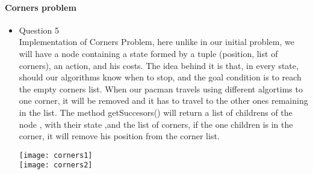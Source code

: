 \paragraph{Corners problem}
\begin{itemize}
\item{Question 5}\\

	\tab Implementation of Corners Problem, here unlike in our initial problem, we will have a node containing a state formed by a tuple (position, list of corners), an action, and his costs.
The idea behind it is that, in every state, should our algorithms know when to stop, and the goal condition is to reach the empty corners list. When our pacman travels using different algortims to one corner, it will be removed and it has to travel to the other ones remaining in the list. The method getSuccesors() will return a list of childrens of the node , with their state ,and the list of corners, if  the one children is in the corner, it will remove his position from the corner list.

\texttt{[image: corners1]}\\
\texttt{[image: corners2]}
\end{itemize}



